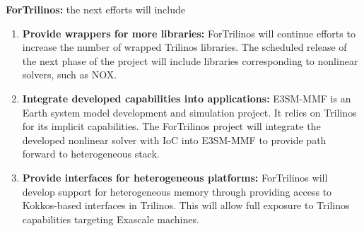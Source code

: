 {\bf ForTrilinos:} the next efforts will include
\begin{enumerate}
  \item \textbf{Provide wrappers for more libraries:} ForTrilinos will continue
    efforts to increase the number of wrapped Trilinos libraries. The scheduled
    release of the next phase of the project will include libraries
    corresponding to nonlinear solvers, such as NOX.
  \item \textbf{Integrate developed capabilities into applications:} E3SM-MMF
    is an Earth system model development and simulation project. It relies on
    Trilinos for its implicit capabilities. The ForTrilinos project will
    integrate the developed nonlinear solver with IoC into E3SM-MMF to provide
    path forward to heterogeneous stack.
  \item \textbf{Provide interfaces for heterogeneous platforms:} ForTrilinos
    will develop support for heterogeneous memory through providing access to
    Kokkos-based interfaces in Trilinos. This will allow full exposure to
    Trilinos capabilities targeting Exascale machines.
\end{enumerate}

